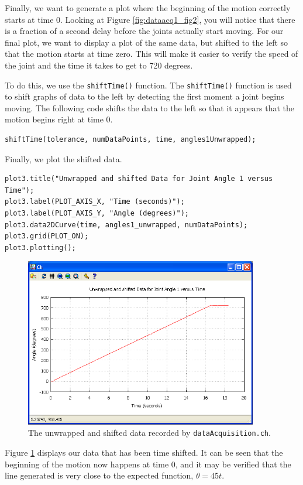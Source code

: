 \documentclass{article}
\begin{document}
Finally, we want to generate a plot where the beginning of the motion correctly starts
at time 0. Looking at Figure \ref{fig:dataacq1_fig2}, you will notice that there is 
a fraction of a second delay before the joints actually start moving. For our final plot, we want
to display a plot of the same data, but shifted to the left so that the motion starts at
time zero. This will make it easier to verify the speed of the joint and the time it takes
to get to 720 degrees. 

To do this, we use the \texttt{shiftTime()} function. The \texttt{shiftTime()} function
is used to shift graphs of data to the left by detecting the first moment a joint begins
moving. The following code shifts the data to the left so that it appears that the motion begins
right at time 0.
\begin{verbatim}
shiftTime(tolerance, numDataPoints, time, angles1Unwrapped);
\end{verbatim}

Finally, we plot the shifted data.

\begin{verbatim}
plot3.title("Unwrapped and shifted Data for Joint Angle 1 versus Time");
plot3.label(PLOT_AXIS_X, "Time (seconds)");
plot3.label(PLOT_AXIS_Y, "Angle (degrees)");
plot3.data2DCurve(time, angles1_unwrapped, numDataPoints);
plot3.grid(PLOT_ON);
plot3.plotting();
\end{verbatim}

\begin{figure}[H]
\centering
\includegraphics[width=4in]{images/dataacq1_plot3.png}
\caption{\label{fig:dataacq1_fig3} The unwrapped and shifted data recorded by \texttt{dataAcquisition.ch}.}
\end{figure}

Figure \ref{fig:dataacq1_fig3}  displays our data that has been time shifted. It can be seen
that the beginning of the motion now happens at time 0, and it may be verified that the
line generated is very close to the expected function, $\theta = 45 t$.
\end{document}
